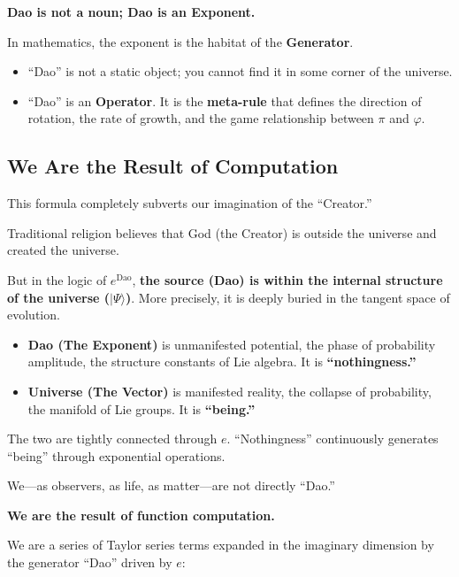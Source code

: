 \documentclass[11pt,a4paper,twoside]{book}
\begin{document}
\textbf{Dao is not a noun; Dao is an Exponent.}

In mathematics, the exponent is the habitat of the \textbf{Generator}.

\begin{itemize}
\item ``Dao'' is not a static object; you cannot find it in some corner of the universe.

\item ``Dao'' is an \textbf{Operator}. It is the \textbf{meta-rule} that defines the direction of rotation, the rate of growth, and the game relationship between $\pi$ and $\varphi$.
\end{itemize}

\subsection{We Are the Result of Computation}

This formula completely subverts our imagination of the ``Creator.''

Traditional religion believes that God (the Creator) is outside the universe and created the universe.

But in the logic of $e^{\text{Dao}}$, \textbf{the source (Dao) is within the internal structure of the universe ($|\Psi\rangle$)}. More precisely, it is deeply buried in the tangent space of evolution.

\begin{itemize}
\item \textbf{Dao (The Exponent)} is unmanifested potential, the phase of probability amplitude, the structure constants of Lie algebra. It is \textbf{``nothingness.''}

\item \textbf{Universe (The Vector)} is manifested reality, the collapse of probability, the manifold of Lie groups. It is \textbf{``being.''}
\end{itemize}

The two are tightly connected through \textbf{$e$}. ``Nothingness'' continuously generates ``being'' through exponential operations.

We---as observers, as life, as matter---are not directly ``Dao.''

\textbf{We are the result of function computation.}

We are a series of Taylor series terms expanded in the imaginary dimension by the generator ``Dao'' driven by $e$:
\end{document}
